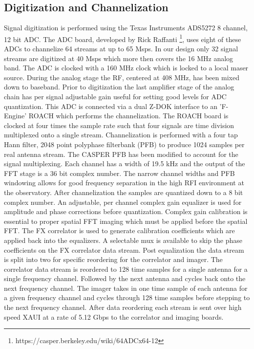 \documentclass[useAMS,macros,usenatbib,onecolumn]{mn2e}
\begin{document}
\subsection{Digitization and Channelization}
\label{channelization}

Signal digitization is performed using the Texas Instruments ADS5272 8 channel, 12 bit ADC.
The ADC board, developed by Rick Raffanti \footnote{https://casper.berkeley.edu/wiki/64ADCx64-12}, uses eight of these ADCs to channelize 64 streams at up to 65 Msps.
In our design only 32 signal streams are digitized at 40 Msps which more then covers the 16 MHz analog band.
The ADC is clocked with a 160 MHz clock which is locked to a local maser source.
During the analog stage the RF, centered at 408 MHz, has been mixed down to baseband.
Prior to digitization the last amplifier stage of the analog chain has per signal adjustable gain useful for setting good levels for ADC quantization.
This ADC is connected via a dual Z-DOK interface to an 'F-Engine' ROACH which performs the channelization.
The ROACH board is clocked at four times the sample rate such that four signals are time division multiplexed onto a single stream.
Channelization is performed with a four tap Hann filter, 2048 point polyphase filterbank (PFB) to produce 1024 samples per real antenna stream.
The CASPER PFB has been modified to account for the signal multiplexing.
Each channel has a width of 19.5 kHz and the output of the FFT stage is a 36 bit complex number.
The narrow channel widths and PFB windowing allows for good frequency separation in the high RFI environment at the observatory.
After channelization the samples are quantized down to a 8 bit complex number.
An adjustable, per channel complex gain equalizer is used for amplitude and phase corrections before quantization.
Complex gain calibration is essential to proper spatial FFT imaging which must be applied before the spatial FFT.
The FX correlator is used to generate calibration coefficients which are applied back into the equalizers.
A selectable mux is available to skip the phase coefficients on the FX correlator data stream.
Post equalization the data stream is split into two for specific reordering for the correlator and imager.
The correlator data stream is reordered to 128 time samples for a single antenna for a single frequency channel.
Followed by the next antenna and cycles back onto the next frequency channel.
The imager takes in one time sample of each antenna for a given frequency channel and cycles through 128 time samples before stepping to the next frequency channel.
After data reordering each stream is sent over high speed XAUI at a rate of 5.12 Gbps to the correlator and imaging boards.
\end{document}
